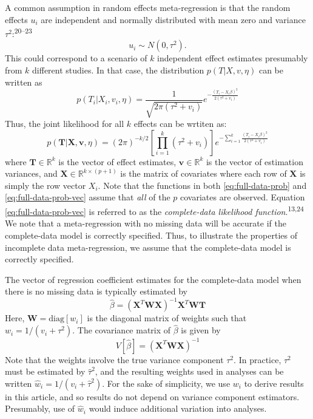 \documentclass[
]{article}
\begin{document}
A common assumption in random effects meta-regression is that the random effects \(u_i\) are independent and normally distributed with mean zero and variance \(\tau^2\):\textsuperscript{20--23}
\[
u_i \sim N(0, \tau^2).
\]
This could correspond to a scenario of \(k\) independent effect estimates presumably from \(k\) different studies.
In that case, the distribution \(p(T | X, v, \eta)\) can be written as
\begin{equation}
p(T_i | X_i, v_i, \eta) = \frac{1}{\sqrt{2\pi(\tau^2 + v_i)}} e^{-\frac{(T_i - X_i\beta)^2}{2(\tau^2 + v_i)}}
\label{eq:full-data-prob}
\end{equation}
Thus, the joint likelihood for all \(k\) effects can be wrtiten as:
\begin{equation}
p(\mathbf{T} | \mathbf{X}, \mathbf{v}, \eta) = (2\pi)^{-k/2} \left[\prod_{i = 1}^k (\tau^2 + v_i)\right] e^{-\sum_{i=1}^k \frac{(T_i - X_i \beta)^2}{2(\tau^2 + v_i)}}
\label{eq:full-data-prob-vec}
\end{equation}
where \(\mathbf{T} \in \mathbb{R}^k\) is the vector of effect estimates, \(\mathbf{v} \in \mathbb{R}^k\) is the vector of estimation variances, and \(\mathbf{X} \in \mathbb{R}^{k \times (p+1)}\) is the matrix of covariates where each row of \(\mathbf{X}\) is simply the row vector \(X_i\).
Note that the functions in both \eqref{eq:full-data-prob} and \eqref{eq:full-data-prob-vec} assume that \emph{all} of the \(p\) covariates are observed.
Equation \eqref{eq:full-data-prob-vec} is referred to as the \emph{complete-data likelihood function}.\textsuperscript{13,24}
We note that a meta-regression with no missing data will be accurate if the complete-data model is correctly specified.
Thus, to illustrate the properties of incomplete data meta-regression, we assume that the complete-data model is correctly specified.

The vector of regression coefficient estimates for the complete-data model when there is no missing data is typically estimated by
\begin{equation}
\hat{\beta} = (\mathbf{X}^T \mathbf{W} \mathbf{X})^{-1} \mathbf{X}^T \mathbf{W} \mathbf{T}
\label{eq:betahat-cd}
\end{equation}
Here, \(\mathbf{W} = \text{diag}[w_i]\) is the diagonal matrix of weights such that \(w_i = 1/(v_i + \tau^2)\).
The covariance matrix of \(\hat{\beta}\) is given by
\begin{equation}
V[\hat{\beta}] = (\mathbf{X}^T \mathbf{W} \mathbf{X})^{-1} 
\label{eq:v-betahat-cd}
\end{equation}
Note that the weights involve the true variance component \(\tau^2\).
In practice, \(\tau^2\) must be estimated by \(\hat{\tau}^2\), and the resulting weights used in analyses can be written \(\hat{w}_i = 1/(v_i + \hat{\tau}^2)\).
For the sake of simplicity, we use \(w_i\) to derive results in this article, and so results do not depend on variance component estimators.
Presumably, use of \(\hat{w}_i\) would induce additional variation into analyses.
\end{document}
